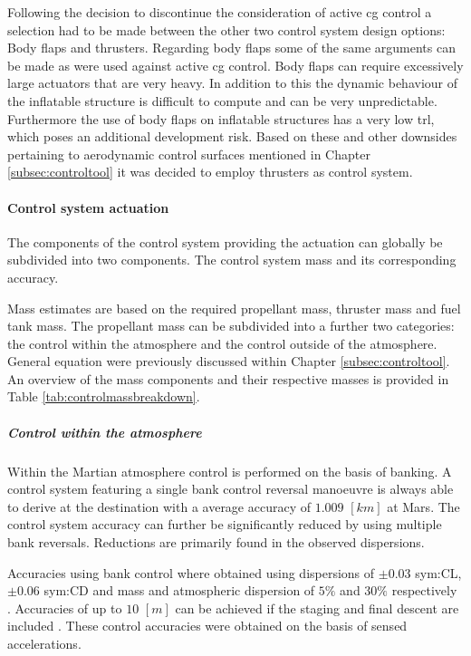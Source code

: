 Following the decision to discontinue the consideration of active \gls{cg} control a selection had to be made between the other two control system design options: Body flaps and thrusters. Regarding body flaps some of the same arguments can be made as were used against active \gls{cg} control. Body flaps can require excessively large actuators that are very heavy. In addition to this the dynamic behaviour of the inflatable structure is difficult to compute and can be very unpredictable. Furthermore the use of body flaps on inflatable structures has a very low \gls{trl}, which poses an additional development risk. Based on these and other downsides pertaining to aerodynamic control surfaces mentioned in Chapter \ref{subsec:controltool} it was decided to employ thrusters as control system.

\paragraph{Control system actuation}

The components of the control system providing the actuation can globally be subdivided into two components. The control system mass and its corresponding accuracy.

Mass estimates are based on the required propellant mass, thruster mass and fuel tank mass. The propellant mass can be subdivided into a further two categories: the control within the atmosphere and the control outside of the atmosphere. General equation were previously discussed within Chapter \ref{subsec:controltool}. An overview of the mass components and their respective masses is provided in Table \ref{tab:controlmassbreakdown}.

\subparagraph{Control within the atmosphere} 

Within the Martian atmosphere control is performed on the basis of banking. A control system featuring a single bank control reversal manoeuvre is always able to derive at the destination with a average accuracy of $1.009$ $[km]$ at Mars\cite{Lu2007}. The control system accuracy can further be significantly reduced by using multiple bank reversals. Reductions are primarily found in the observed dispersions.

Accuracies using bank control where obtained using dispersions of $\pm 0.03 $ \gls{sym:CL}, $\pm 0.06 $ \gls{sym:CD} and mass and atmospheric dispersion of $5\%$ and $30\%$ respectively \cite{Lu2007}. Accuracies of up to $10$ $[m]$ can be achieved if the staging and final descent are included \cite{Davis2010}. These control accuracies were obtained on the basis of sensed accelerations.

